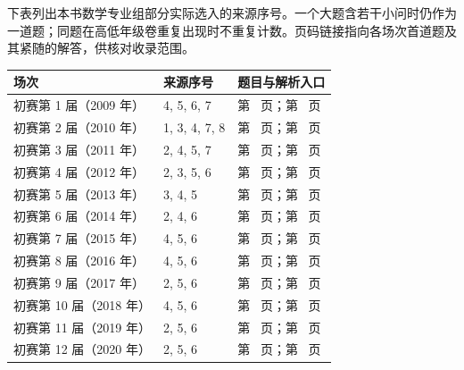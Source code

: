 \documentclass[UTF8,12pt,a4paper,fontset=fandol]{ctexart}
\begin{document}
下表列出本书数学专业组部分实际选入的来源序号。一个大题含若干小问时仍作为一道题；同题在高低年级卷重复出现时不重复计数。页码链接指向各场次首道题及其紧随的解答，供核对收录范围。
\begin{longtable}{p{}p{}p{}}
\toprule 场次 & 来源序号 & 题目与解析入口\\\midrule\endhead


初赛第 1 届（2009 年） & 4, 5, 6, 7 & 第~\pageref{ex:pre01-math:4} 页；第~\pageref{ans:pre01-math:4} 页\\

初赛第 2 届（2010 年） & 1, 3, 4, 7, 8 & 第~\pageref{ex:pre02-math:1} 页；第~\pageref{ans:pre02-math:1} 页\\

初赛第 3 届（2011 年） & 2, 4, 5, 7 & 第~\pageref{ex:pre03-math:2} 页；第~\pageref{ans:pre03-math:2} 页\\

初赛第 4 届（2012 年） & 2, 3, 5, 6 & 第~\pageref{ex:pre04-math:2} 页；第~\pageref{ans:pre04-math:2} 页\\

初赛第 5 届（2013 年） & 3, 4, 5 & 第~\pageref{ex:pre05-math:3} 页；第~\pageref{ans:pre05-math:3} 页\\

初赛第 6 届（2014 年） & 2, 4, 6 & 第~\pageref{ex:pre06-math:2} 页；第~\pageref{ans:pre06-math:2} 页\\

初赛第 7 届（2015 年） & 4, 5, 6 & 第~\pageref{ex:pre07-math:4} 页；第~\pageref{ans:pre07-math:4} 页\\

初赛第 8 届（2016 年） & 4, 5, 6 & 第~\pageref{ex:pre08-math:4} 页；第~\pageref{ans:pre08-math:4} 页\\

初赛第 9 届（2017 年） & 2, 5, 6 & 第~\pageref{ex:pre09-math:2} 页；第~\pageref{ans:pre09-math:2} 页\\

初赛第 10 届（2018 年） & 4, 5, 6 & 第~\pageref{ex:pre10-math:4} 页；第~\pageref{ans:pre10-math:4} 页\\

初赛第 11 届（2019 年） & 2, 5, 6 & 第~\pageref{ex:ch10-11th-A:2} 页；第~\pageref{ans:ch10-11th-A:2} 页\\

初赛第 12 届（2020 年） & 2, 5, 6 & 第~\pageref{ex:ch09-12th-A:2} 页；第~\pageref{ans:ch09-12th-A:2} 页\\


\end{longtable}
\end{document}

